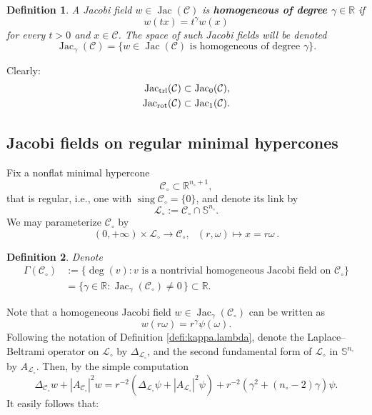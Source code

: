 \documentclass[11pt, letterpaper, reqno]{amsart}
\numberwithin{equation}{section}
\newtheorem{Def}{Definition}[section]
\theoremstyle{remark}
\newcommand{\RR}{\mathbb{R}}
\newcommand{\SSp}{\mathbb{S}}
\newcommand{\cC}{\mathcal{C}}
\newcommand{\cL}{\mathcal{L}}
\newcommand{\sing}{\operatorname{sing}}
\newcommand{\Jac}{\operatorname{Jac}}
\begin{document}
  \begin{Def}
  A Jacobi field $w\in \Jac(\cC)$ is \textbf{homogeneous of degree $\gamma \in \RR$} if
  \[ w(tx) = t^\gamma w(x) \]
  for every $t>0$ and $x \in \cC$. The space of such Jacobi fields will be denoted
  \[ \Jac_\gamma(\cC) = \{ w \in \Jac(\cC) \text{ is homogeneous of degree $\gamma$} \}. \]
\end{Def}

Clearly:
\begin{align} 
	\Jac_\textnormal{trl}(\cC) \subset \Jac_0(\cC), \label{eq:translation.inclusion} \\
	\Jac_\textnormal{rot}(\cC) \subset \Jac_1(\cC). \label{eq:rotation.inclusion}
\end{align}








\subsection{Jacobi fields on regular minimal hypercones} \label{Subsec_reg Min Cone}
Fix a nonflat minimal hypercone
\[ \cC_\circ\subset\RR^{n_\circ+1}, \]
that is regular, i.e., one with $\sing \cC_\circ = \{0\}$, and denote its link by 
\[ \cL_\circ := \cC_\circ\cap \SSp^{n_\circ}. \]
We may parameterize $\cC_\circ$ by 
\[
  (0, +\infty)\times \cL_\circ \to \cC_\circ, \ \ \ (r, \omega) \mapsto x= r\omega\,.
\] 

\begin{Def} \label{def:gamma.c}
	Denote
	\begin{align*}
		\Gamma(\cC_\circ) 
			& := \{\deg(v): v \text{ is a nontrivial homogeneous Jacobi field on }\cC_\circ\} \\
			& = \{ \gamma \in \RR : \Jac_\gamma(\cC_\circ) \neq 0 \, \}  \subset \RR.
	\end{align*}
\end{Def}

Note that a homogeneous Jacobi field $w \in \Jac_\gamma(\cC_\circ)$ can be written as 
\begin{equation} \label{eq:jf.gamma}
w(r\omega) = r^\gamma \psi(\omega).
\end{equation}
Following the notation of Definition \ref{defi:kappa.lambda}, denote the Laplace--Beltrami operator on $\cL_\circ$ by $\Delta_{\cL_\circ}$, and the second fundamental form of $\cL_\circ$ in $\SSp^{n_\circ}$ by $A_{\cL_\circ}$. Then, by the simple computation
\[
	\Delta_{\cC_\circ} w + |A_{\cC_\circ}|^2 w = r^{-2} (\Delta_{\cL_\circ} \psi + |A_{\cL_\circ}|^2 \psi) + r^{-2} (\gamma^2 + (n_\circ-2) \gamma)  \psi.
\]
It easily follows that:
\end{document}
